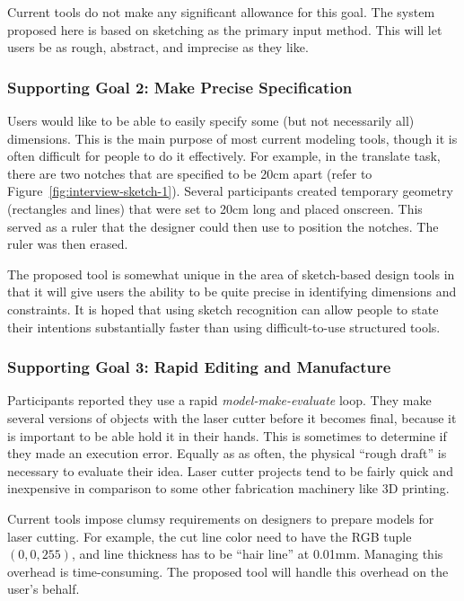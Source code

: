 \documentclass[11pt]{article}
\begin{document}
Current tools do not make any significant allowance for this goal. The
system proposed here is based on sketching as the primary input
method. This will let users be as rough, abstract, and imprecise as
they like.

\subsubsection{Supporting Goal 2: Make Precise Specification}

Users would like to be able to easily specify some (but not
necessarily all) dimensions. This is the main purpose of most current
modeling tools, though it is often difficult for people to do it
effectively. For example, in the translate task, there are two notches
that are specified to be 20cm apart (refer to
Figure~\ref{fig:interview-sketch-1}). Several participants created
temporary geometry (rectangles and lines) that were set to 20cm long
and placed onscreen. This served as a ruler that the designer could
then use to position the notches. The ruler was then erased.

The proposed tool is somewhat unique in the area of sketch-based
design tools in that it will give users the ability to be quite
precise in identifying dimensions and constraints. It is hoped that
using sketch recognition can allow people to state their intentions
substantially faster than using difficult-to-use structured tools.

\subsubsection{Supporting Goal 3: Rapid Editing and Manufacture}

Participants reported they use a rapid \textit{model-make-evaluate}
loop. They make several versions of objects with the laser cutter
before it becomes final, because it is important to be able hold it in
their hands. This is sometimes to determine if they made an execution
error. Equally as as often, the physical ``rough draft'' is necessary
to evaluate their idea. Laser cutter projects tend to be fairly quick
and inexpensive in comparison to some other fabrication machinery like
3D printing.

Current tools impose clumsy requirements on designers to prepare
models for laser cutting. For example, the cut line color need to have
the RGB tuple $(0,0,255)$, and line thickness has to be ``hair line''
at 0.01mm. Managing this overhead is time-consuming. The proposed tool
will handle this overhead on the user's behalf.
\end{document}
